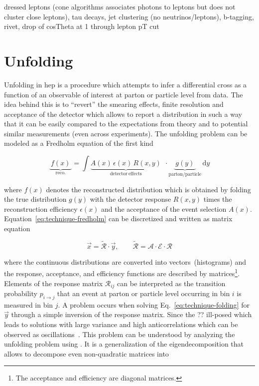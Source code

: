 dressed leptons (cone algorithms associates photons to leptons but does not cluster close leptons), tau decays, jet clustering (no neutrinos/leptons), b-tagging, rivet, drop of cosTheta at 1 through lepton pT cut



\section{Unfolding}

Unfolding in \gls{hep} is a procedure which attempts to infer a differential cross as a function of an observable of interest at parton or particle level from data. The idea behind this is to ``revert'' the smearing effects, finite resolution and acceptance of the detector which allows to report a distribution in such a way that it can be easily compared to the expectations from theory and to potential similar measurements (even across experiments). The unfolding problem can be modeled as a Fredholm equation of the first kind

\begin{equation}
\underbrace{~f(x)~}_\mathrm{reco.}=\int \underbrace{A(x)\,\epsilon(x)\, R(x,y)}_\mathrm{detector~effects}~~\cdot \underbrace{~g(y)~}_\mathrm{parton/particle}\, \mathrm{d}y \label{eq:technique-fredholm}
\end{equation}

where $f(x)$ denotes the reconstructed distribution which is obtained by folding the true distribution $g(y)$ with the detector response $R(x,y)$ times the reconstruction efficiency $\epsilon(x)$ and the acceptance of the event selection $A(x)$. Equation~\ref{eq:technique-fredholm} can be discretized and written as matrix equation

\begin{equation}
\vec{x} = \widetilde{\mathcal{R}}\cdot\vec{y},\qquad \widetilde{\mathcal{R}}=\mathcal{A}\cdot\mathcal{E}\cdot\mathcal{R} \label{eq:technique-folding}
\end{equation}

where the continuous distributions are converted into vectors~(histograms) and the response, acceptance, and efficiency functions are described by matrices\footnote{The acceptance and efficiency are diagonal matrices.}. Elements of the response matrix $\mathcal{R}_{ij}$ can be interpreted as the transition probability $p_{i\to j}$ that an event at parton or particle level occurring in bin $i$ is measured in bin $j$. A problem occurs when solving Eq.~\ref{eq:technique-folding} for $\vec{y}$ through a simple inversion of the response matrix. Since the ?? ill-posed which leads to solutions with large variance and high anticorrelations which can be observed as oscillations~\cite{Cowan:2002in}. This problem can be understood by analyzing the unfolding problem using . It is a generalization of the eigendecomposition that allows to decompose even non-quadratic matrices into 


